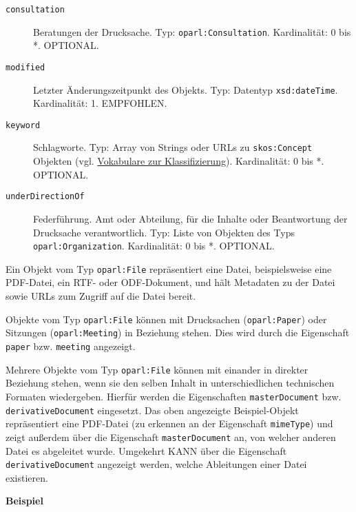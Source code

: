 \documentclass[,a4paper]{article}
\begin{document}
\begin{description}
\item[\texttt{consultation}]
Beratungen der Drucksache. Typ: \texttt{oparl:Consultation}.
Kardinalität: 0 bis *. OPTIONAL.
\item[\texttt{modified}]
Letzter Änderungszeitpunkt des Objekts. Typ: Datentyp
\texttt{xsd:dateTime}. Kardinalität: 1. EMPFOHLEN.
\item[\texttt{keyword}]
Schlagworte. Typ: Array von Strings oder URLs zu \texttt{skos:Concept}
Objekten (vgl. \hyperref[vokabulareux5fklassifizierung]{Vokabulare zur
Klassifizierung}). Kardinalität: 0 bis *. OPTIONAL.
\item[\texttt{underDirectionOf}]
Federführung. Amt oder Abteilung, für die Inhalte oder Beantwortung der
Drucksache verantwortlich. Typ: Liste von Objekten des Typs
\texttt{oparl:Organization}. Kardinalität: 0 bis *. OPTIONAL.
\end{description}


Ein Objekt vom Typ \texttt{oparl:File} repräsentiert eine Datei,
beispielsweise eine PDF-Datei, ein RTF- oder ODF-Dokument, und hält
Metadaten zu der Datei sowie URLs zum Zugriff auf die Datei bereit.

Objekte vom Typ \texttt{oparl:File} können mit Drucksachen
(\texttt{oparl:Paper}) oder Sitzungen (\texttt{oparl:Meeting}) in
Beziehung stehen. Dies wird durch die Eigenschaft \texttt{paper} bzw.
\texttt{meeting} angezeigt.

Mehrere Objekte vom Typ \texttt{oparl:File} können mit einander in
direkter Beziehung stehen, wenn sie den selben Inhalt in
unterschiedlichen technischen Formaten wiedergeben. Hierfür werden die
Eigenschaften \texttt{masterDocument} bzw. \texttt{derivativeDocument}
eingesetzt. Das oben angezeigte Beispiel-Objekt repräsentiert eine
PDF-Datei (zu erkennen an der Eigenschaft \texttt{mimeType}) und zeigt
außerdem über die Eigenschaft \texttt{masterDocument} an, von welcher
anderen Datei es abgeleitet wurde. Umgekehrt KANN über die Eigenschaft
\texttt{derivativeDocument} angezeigt werden, welche Ableitungen einer
Datei existieren.

\textbf{Beispiel}
\end{document}
